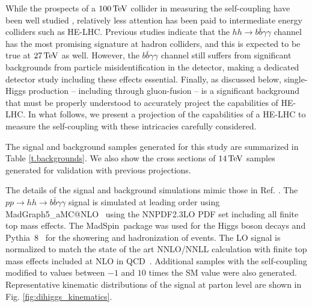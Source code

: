 While the prospects of a $100\, {\rm TeV}$ collider in measuring the self-coupling have been well studied \cite{Contino:2016spe}, relatively less attention has been paid to intermediate energy colliders such as HE-LHC. Previous studies indicate that the $hh\rightarrow b\bar{b}\gamma\gamma$ channel has the most promising signature at hadron colliders, and this is expected to be true at $27\, {\rm TeV}$ as well. However, the $b\bar{b}\gamma\gamma$ channel still suffers from significant backgrounds from particle misidentification in the detector, making a dedicated detector study including these effects essential. Finally, as discussed below, single-Higgs production -- including through gluon-fusion -- is a significant background that must be properly understood to accurately project the capabilities of HE-LHC. In what follows, we present a projection of the capabilities of a HE-LHC to measure the self-coupling with these intricacies carefully considered.


The signal and background samples generated for this study are summarized in Table \ref{t.backgrounds}. We also show the cross sections of $14\, {\rm TeV}$ samples generated for validation with previous projections. 

The details of the signal and background simulations mimic those in Ref. \cite{Homiller:2018dgu}. 
The $pp \rightarrow hh \rightarrow b\bar{b}\gamma\gamma$ signal is simulated at leading order using {\sc\small MadGraph5\_aMC@NLO}\ \cite{Alwall:2014hca, Hirschi:2015iia} using the NNPDF2.3LO PDF set \cite{Ball:2014uwa} including all finite top mass effects. The {\sc\small MadSpin}\ package \cite{Artoisenet:2012st} was used for the Higgs boson decays and {\sc\small Pythia~8}\ \cite{Sjostrand:2014zea} for the showering and hadronization of events. The LO signal is normalized to match the state of the art NNLO/NNLL calculation with finite top mass effects included at NLO in QCD~\cite{Grazzini:2018bsd}. Additional samples with the self-coupling modified to values between $-1$ and $10$ times the SM value were also generated. Representative kinematic distributions of the signal at parton level are shown in Fig. \ref{fig:dihiggs_kinematics}.

